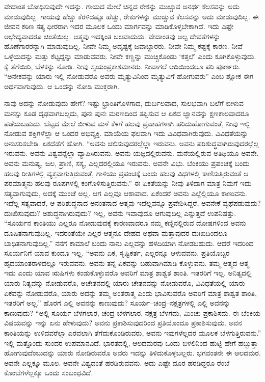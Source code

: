 \vskip 0.2cm 

ವೇದಾಂತ ಬೋಧಿಸುವುದೇ ಇದನ್ನು. ಗಾಯದ ಮೇಲೆ ಚಿನ್ನದ ರೇಕನ್ನು ಮುಚ್ಚುವ ಅನರ್ಥ ಕೆಲಸವನ್ನು ಅದು ಮಾಡುವುದಿಲ್ಲ. ಗಾಯವು ಹೆಚ್ಚು ಕೆರಳಿದಷ್ಟೂ ಹೆಚ್ಚು, ರೇಕುಗಳನ್ನು ಮುಚ್ಚುವ ಕೆಲಸವನ್ನು ಅದು ಮಾಡುವುದಿಲ್ಲ. ಈ ಜೀವನ ಕಠಿಣ ಸತ್ಯ ಧೀರರಾಗಿ ಇದರ ಮೂಲಕ ಒಂದು ಮಾರ್ಗವನ್ನು ಮಾಡಿಕೊಳ್ಳಬೇಕಾಗಿದೆ. ಇದು ಎಷ್ಟೇ ಅಭೇದ್ಯವಾದರೂ ಚಿಂತೆಯಿಲ್ಲ. ಆತ್ಮವು ಇದಕ್ಕಿಂತ ಬಲವಾದುದು. ವೇದಾಂತವು ಅಲ್ಪ ದೇವತೆಗಳನ್ನು ಹೊಣೆಗಾರರನ್ನಾಗಿ ಮಾಡುವುದಿಲ್ಲ. ನೀವೇ ನಿಮ್ಮ ಅದೃಷ್ಟಕ್ಕೆ ಜವಾಬ್ದಾರರು. ನೀವೇ ನಿಮ್ಮ ಕಷ್ಟಕ್ಕೆ ಕಾರಣ. ನೀವೆ ಒಳ್ಳೆಯದನ್ನು ಮತ್ತು ಕೆಟ್ಟದ್ದನ್ನು ಮಾಡುವವರು. ನೀವೇ ಕಣ್ಣನ್ನು ಮುಚ್ಚಿಕೊಂಡು ‘ಕತ್ತಲೆ’ ಎಂದು ಕೂಗಿಕೊಳ್ಳುವುದು. ಕೈ ತೆಗೆಯಿರಿ, ಬೆಳಕನ್ನು ನೋಡಿ. ನೀವು ಸ್ವಯಂಪ್ರಕಾಶಮಾನರು. ನೀವಾಗಲೆ ಆದಿಯಿಂದಲೂ ಪರಿ ಪೂರ್ಣರು. “ಅನೇಕವನ್ನು ಯಾರು ಇಲ್ಲಿ ನೋಡುವರೊ ಅವರು ಮೃತ್ಯುವಿನಿಂದ ಮೃತ್ಯುವಿಗೆ ಹೋಗುವರು” ಎಂಬ ಶ್ಲೋಕ ಈಗ ಅರ್ಥವಾಗುವುದು. ಆ ಒಂದನ್ನು ನೋಡಿ ಮುಕ್ತರಾಗಿ.

\vskip 0.2cm 

ನಾವು ಅದನ್ನು ನೋಡುವುದು ಹೇಗೆ? ಇಷ್ಟು ಭ್ರಾಂತಿಗೊಳಗಾದ, ದುರ್ಬಲವಾದ, ಸುಲಭವಾಗಿ ಬಲೆಗೆ ಬೀಳುವ ಮನಸ್ಸು ಕೂಡ ದೃಢವಾಗಬಲ್ಲದು, ಪುನಃ ಪುನಃ ಮರಣದಿಂದ ತಪ್ಪಿಸುವ ಆ ಏಕದ ಜ್ಞಾನವನ್ನು ಕ್ಷಣಕಾಲವಾದರೂ ಪಡೆಯಬಹುದು. ಬೆಟ್ಟದ ಮೇಲೆ ಬೀಳುವ ಮಳೆ ಕೆಳಗೆ ಹಲವು ಪ್ರವಾಹಗಳಾಗಿ ಹರಿದುಹೋಗುವಂತೆ, ನೀವು ಇಲ್ಲಿ ನೋಡುವ ಶಕ್ತಿಗಳೆಲ್ಲಾ ಆ ಒಂದರ ಅಭಿವ್ಯಕ್ತಿ. ಮಾಯೆಯ ಫಲವಾಗಿ ಇದು ವಿವಿಧವಾಗಿರುವುದು. ವಿವಿಧತೆಯನ್ನು ಅನುಸರಿಸಬೇಡಿ. ಏಕದೆಡೆಗೆ ಹೋಗಿ. “ಅವನು ಚಲಿಸುವುದರಲ್ಲೆಲ್ಲಾ ಇರುವನು. ಅವನು ಪರಿಶುದ್ಧವಾಗಿರುವುದರಲ್ಲೆಲ್ಲ ಇರುವನು. ಅವನು ವಿಶ್ವವನ್ನೆಲ್ಲಾ ವ್ಯಾಪಿಸಿರುವನು. ಅವನು ಯಜ್ಞದಲ್ಲಿರುವನು. ಮನೆಯಲ್ಲಿರುವ ಅತಿಥಿಯೂ ಅವನೇ. ಅವನು ಮನುಷ್ಯ, ಜಲ, ಪ್ರಾಣಿ, ಸಸ್ಯ, ಎಲ್ಲದರಲ್ಲಿಯೂ ಇರುವನು. ಅವನೇ ವಿಭು. ಬೆಂಕಿಯು ಪ್ರಪಂಚಕ್ಕೆ ಬಂದು ಹಲವು ರೀತಿಗಳಲ್ಲಿ ವ್ಯಕ್ತವಾಗುತ್ತಿರುವಂತೆ, ಗಾಳಿಯು ಪ್ರಪಂಚಕ್ಕೆ ಬಂದು ಹಲವು ವಿಧಗಳಲ್ಲಿ ಕಾಣಿಸುತ್ತಿರುವಂತೆ ಆ ಪರಮಾತ್ಮನು ಹಲವು ರೂಪಗಳಲ್ಲಿ ಕಂಗೊಳಿಸುತ್ತಿರುವನು.” ಈ ಏಕತೆಯನ್ನು ನೀವು ತಿಳಿದಾಗ ಮಾತ್ರ ನಿಮಗೆ ಇದು ಸತ್ಯವಾಗುವುದು, ಅದಕ್ಕೆ ಮುಂಚೆ ಅಲ್ಲ. ಆಗ ಎಲ್ಲವೂ ಆಶಾವಾದ. ಏಕೆಂದರೆ ಅವನು ಎಲ್ಲೆಲ್ಲಿಯೂ ಕಾಣುವನು. ಇದೆಲ್ಲ ಸತ್ಯವಾದರೆ, ಆ ಪರಿಶುದ್ಧನಾದ ಅನಂತನಾದ ಆತ್ಮವು ಇದೆಲ್ಲವನ್ನೂ ಪ್ರವೇಶಿಸಿದ್ದರೆ, ಅವನೇಕೆ ವ್ಯಥೆಪಡುವುದು? ದುಃಖಿಸುವುದು? ಅಶುದ್ಧನಾಗಿರುವುದು? ಇಲ್ಲ, ಅವನು ಇವಾವುದೂ ಆಗುವುದಿಲ್ಲ ಎನ್ನುತ್ತದೆ ಉಪನಿಷತ್ತು. “ಸೂರ್ಯನ ಕಾಂತಿಯು ಎಲ್ಲರೂ ನೋಡುವುದಕ್ಕೆ ಕಾರಣವಾದರೂ ನಮ್ಮ ಕಣ್ಣಿನಲ್ಲಿರುವ ದೋಷಗಳಿಂದ ಅವನು ದೂಷಿತನಾಗುವುದಿಲ್ಲ. ಇದರಂತೆಯೇ ಎಲ್ಲರ ಆತ್ಮನೂ ದೇಹದ ಅಥವಾ ಮತ್ತಾವುದರ ದುಃಖದಿಂದಲೂ ಬಾಧಿತನಾಗುವುದಿಲ್ಲ.” ನನಗೆ ಕಾಮಾಲೆ ಬಂದು ನಾನು ಎಲ್ಲವನ್ನು ಹಳದಿಯಾಗಿ ನೋಡಬಹುದು. ಆದರೆ ಇದರಿಂದ ಸೂರ್ಯನಿಗೆ ಯಾವ ಕುಂದೂ ಇಲ್ಲ. “ಅವನು ಏಕ, ಸೃಷ್ಟಿಕರ್ತ, ಎಲ್ಲರನ್ನೂ ಆಳುವವನು. ಪ್ರತಿಯೊಬ್ಬರ ಹೃದಯಾಂತರಾಳದಲ್ಲೂ ಇರುವವನು. ಅವನು ತನ್ನ ಏಕವನ್ನು ಬಹುವಾಗಿಮಾಡಿ ಕೊಳ್ಳುವನು. ತಮ್ಮ ಆತ್ಮದ ಆತ್ಮ ಇದು ಎಂದು ಯಾವ ಋಷಿಗಳು ಕಂಡುಕೊಳ್ಳುವರೊ ಅವರಿಗೆ ಮಾತ್ರ ಶಾಶ್ವತ ಶಾಂತಿ. ಇತರರಿಗೆ ಇಲ್ಲ. ಅನಿತ್ಯದಲ್ಲಿ ಯಾರು ನಿತ್ಯವನ್ನು ನೋಡುವರೊ, ಅಚೇತನದಲ್ಲಿ ಯಾರು ಚೇತನವನ್ನು ನೋಡುವರೊ, ವಿವಿಧತೆಯಲ್ಲಿ ಯಾರು ಏಕವನ್ನು ನೋಡುವರೊ, ಯಾರು ಅದನ್ನು ತಮ್ಮ ಅಂತರಾತ್ಮ ಎಂದು ಭಾವಿಸುವರೊ ಅವರಿಗೆ ಮಾತ್ರ ಶಾಶ್ವತ ಶಾಂತಿ, ಇತರರಿಗೆ ಅಲ್ಲ.” ಹೊರಗೆ ಎಲ್ಲಿ ಅವನನ್ನು ಕಾಣುವುದು? ಸೂರ್ಯ–ಚಂದ್ರ–ನಕ್ಷತ್ರಗಳಲ್ಲಿ ಎಲ್ಲಿ ಅವನನ್ನು ಕಾಣುವುದು? “ಅಲ್ಲಿ ಸೂರ್ಯ ಬೆಳಗಲಾರ, ಚಂದ್ರ ಬೆಳಗಲಾರ, ನಕ್ಷತ್ರ ಬೆಳಗದು, ಮಿಂಚು ಪ್ರಕಾಶಿಸದು. ಈ ಬೆಂಕಿಯ ವಿಷಯವನ್ನು ಇನ್ನು ಏನು ಹೇಳುವುದು? ಅವನು ಪ್ರಕಾಶಿಸುವುದರಿಂದ ಪ್ರತಿಯೊಂದೂ ಪ್ರಕಾಶಿಸುವುದು. ಅವನ ಕಾಂತಿಯನ್ನು ಉಳಿದವರೆಲ್ಲಾ ಎರವಲಾಗಿ ತೆಗೆದುಕೊಂಡಿರುವರು, ಅವನು ಇವುಗಳೆಲ್ಲದರ ಮೂಲಕ ಬೆಳಗುತ್ತಿರುವನು.” ಇಲ್ಲಿ ಮತ್ತೊಂದು ಸುಂದರ ಉಪಮಾನವಿದೆ. ಭಾರತದಲ್ಲಿ, ಆಲದಮರವು ಒಂದು ಬಿಳಲಿನಿಂದ ಹುಟ್ಟಿ ಹೇಗೆ ಹಬ್ಬುತ್ತಾ ಹೋಗುವುದೆಂಬುದನ್ನು ಯಾರು ನೋಡಿರುವರೊ ಅವರು ಇದನ್ನು ತಿಳಿದುಕೊಳ್ಳಬಲ್ಲರು. ಭಗವಂತನೇ ಈ ಆಲದಮರ. ಅವನೇ ಎಲ್ಲಕ್ಕೂ ಮೂಲ. ಅವನೇ ವಿಶ್ವದಂತೆ ಹರಡಿರುವವನು. ಅದು ಎಷ್ಟೇ ದೂರ ಹರಡಿದ್ದರೂ ರೆಂಬೆ ಕೊಂಬೆಗಳೆಲ್ಲಕ್ಕೂ ಒಂದು ಸಂಬಂಧವಿದೆ.


